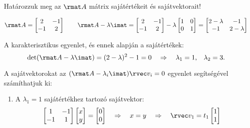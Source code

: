 \begin{example}
  Határozzuk meg az $\rmat A$ mátrix sajátértékeit és sajátvektorait!

  $$
    \rmat A = \begin{bmatrix}
      2  & -1 \\
      -1 & 2
    \end{bmatrix}
    \qquad
    \rmat A - \lambda \imat = \begin{bmatrix}
      2  & -1 \\
      -1 & 2
    \end{bmatrix} - \lambda \begin{bmatrix}
      1 & 0 \\
      0 & 1
    \end{bmatrix} = \begin{bmatrix}
      2 - \lambda & -1          \\
      -1          & 2 - \lambda
    \end{bmatrix}
  $$

  A karakterisztikus egyenlet, és ennek alapján a sajátértékek:
  $$
    \det(\rmat A - \lambda \imat) = (2 - \lambda)^2 - 1 = 0
    \quad \Rightarrow \quad
    \lambda_1 = 1 \text, \quad \lambda_2 = 3 \text.
  $$

  A sajátvektorokat az $(\rmat A - \lambda_i \imat) \rvec v_i = 0$
  egyenlet segítségével számíthatjuk ki:

  \begin{enumerate}
    \item A $\lambda_1 = 1$ sajátértékhez tartozó sajátvektor:
          $$
            \begin{bmatrix}
              1  & -1 \\
              -1 & 1
            \end{bmatrix} \begin{bmatrix}
              x \\
              y
            \end{bmatrix} = \begin{bmatrix}
              0 \\
              0
            \end{bmatrix}
            \quad \Rightarrow \quad
            x = y
            \quad \Rightarrow \quad
            \rvec v_1 = t_1 \begin{bmatrix}
              1 \\
              1
            \end{bmatrix}
          $$


\end{enumerate}
\end{example}
